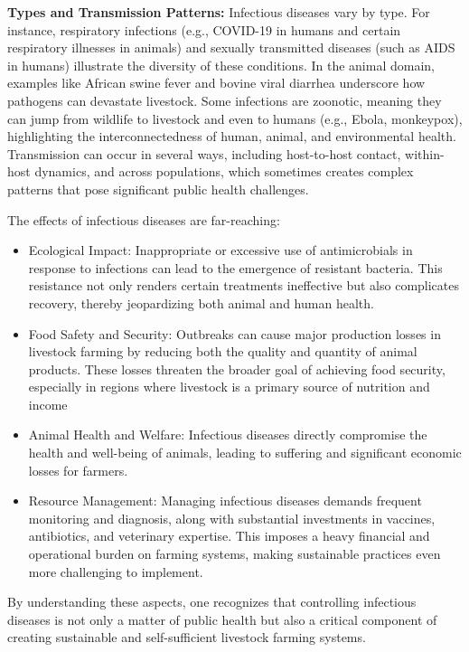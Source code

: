 \textbf{Types and Transmission Patterns:} Infectious diseases vary by type. For instance, respiratory infections (e.g., COVID-19 in humans and certain respiratory illnesses in animals) and sexually transmitted diseases (such as AIDS in humans) illustrate the diversity of these conditions. In the animal domain, examples like African swine fever and bovine viral diarrhea underscore how pathogens can devastate livestock. Some infections are zoonotic, meaning they can jump from wildlife to livestock and even to humans (e.g., Ebola, monkeypox), highlighting the interconnectedness of human, animal, and environmental health. Transmission can occur in several ways, including host-to-host contact, within-host dynamics, and across populations, which sometimes creates complex patterns that pose significant public health challenges.

The effects of infectious diseases are far-reaching:
\begin{itemize}
    \item Ecological Impact: Inappropriate or excessive use of antimicrobials in response to infections can lead to the emergence of resistant bacteria. This resistance not only renders certain treatments ineffective but also complicates recovery, thereby jeopardizing both animal and human health.
    \item Food Safety and Security: Outbreaks can cause major production losses in livestock farming by reducing both the quality and quantity of animal products. These losses threaten the broader goal of achieving food security, especially in regions where livestock is a primary source of nutrition and income
    \item Animal Health and Welfare: Infectious diseases directly compromise the health and well-being of animals, leading to suffering and significant economic losses for farmers.
    \item Resource Management: Managing infectious diseases demands frequent monitoring and diagnosis, along with substantial investments in vaccines, antibiotics, and veterinary expertise. This imposes a heavy financial and operational burden on farming systems, making sustainable practices even more challenging to implement.
\end{itemize}

By understanding these aspects, one recognizes that controlling infectious diseases is not only a matter of public health but also a critical component of creating sustainable and self-sufficient livestock farming systems.

